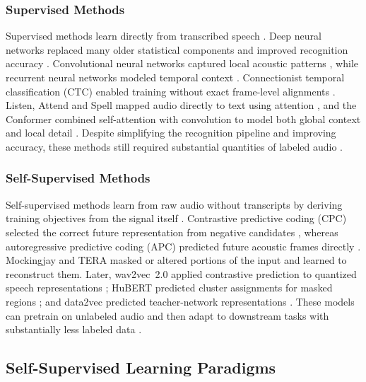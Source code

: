\documentclass[conference]{IEEEtran}
\begin{document}
\subsubsection{Supervised Methods}

Supervised methods learn directly from transcribed speech \cite{hinton2012dnn,abdelhamid2014cnn,graves2013rnn,graves2006ctc,chan2016las,gulati2020conformer}. Deep neural networks replaced many older statistical components and improved recognition accuracy \cite{hinton2012dnn}. Convolutional neural networks captured local acoustic patterns \cite{abdelhamid2014cnn}, while recurrent neural networks modeled temporal context \cite{graves2013rnn}. Connectionist temporal classification (CTC) enabled training without exact frame-level alignments \cite{graves2006ctc}. Listen, Attend and Spell mapped audio directly to text using attention \cite{chan2016las}, and the Conformer combined self-attention with convolution to model both global context and local detail \cite{gulati2020conformer}. Despite simplifying the recognition pipeline and improving accuracy, these methods still required substantial quantities of labeled audio \cite{hinton2012dnn,chan2016las,gulati2020conformer}.

\subsubsection{Self-Supervised Methods}

Self-supervised methods learn from raw audio without transcripts by deriving training objectives from the signal itself \cite{oord2018cpc,chung2020apc,liu2020mockingjay,liu2021tera,baevski2020wav2vec2,hsu2021hubert,chen2022wavlm,baevski2022data2vec}. Contrastive predictive coding (CPC) selected the correct future representation from negative candidates \cite{oord2018cpc}, whereas autoregressive predictive coding (APC) predicted future acoustic frames directly \cite{chung2020apc}. Mockingjay \cite{liu2020mockingjay} and TERA \cite{liu2021tera} masked or altered portions of the input and learned to reconstruct them. Later, wav2vec~2.0 applied contrastive prediction to quantized speech representations \cite{baevski2020wav2vec2}; HuBERT predicted cluster assignments for masked regions \cite{hsu2021hubert}; and data2vec predicted teacher-network representations \cite{baevski2022data2vec}. These models can pretrain on unlabeled audio and then adapt to downstream tasks with substantially less labeled data \cite{baevski2020wav2vec2,hsu2021hubert}.

\subsection{Self-Supervised Learning Paradigms}
\end{document}
